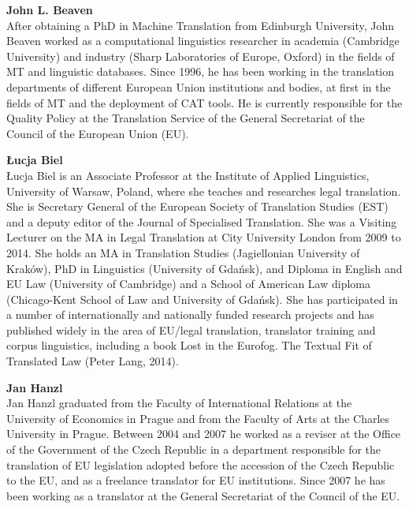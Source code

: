 \noindent
\textbf{John L. Beaven}\\
After obtaining a PhD in Machine Translation from Edinburgh University, John Beaven worked as a computational linguistics researcher in academia (Cambridge University) and industry (Sharp Laboratories of Europe, Oxford) in the fields of MT and linguistic databases. Since 1996, he has been working in the translation departments of different European Union institutions and bodies, at first in the fields of MT and the deployment of CAT tools. He is currently responsible for the Quality Policy at the Translation Service of the General Secretariat of the Council of the European Union (EU).

\medskip\noindent
\textbf{Łucja Biel}\\
Łucja Biel is an Associate Professor at the Institute of Applied Linguistics, University of Warsaw, Poland, where she teaches and researches legal translation. She is Secretary General of the European Society of Translation Studies (EST) and a deputy editor of the Journal of Specialised Translation. She was a Visiting Lecturer on the MA in Legal Translation at City University London from 2009 to 2014. She holds an MA in Translation Studies (Jagiellonian University of Kraków), PhD in Linguistics (University of Gdańsk), and Diploma in English and EU Law (University of Cambridge) and a School of American Law diploma (Chicago-Kent School of Law and University of Gdańsk). She has participated in a number of internationally and nationally funded research projects and has published widely in the area of EU/legal translation, translator training and corpus linguistics, including a book Lost in the Eurofog. The Textual Fit of Translated Law (Peter Lang, 2014).

\medskip\noindent
\textbf{Jan Hanzl}\\
Jan Hanzl graduated from the Faculty of International Relations at the University of Economics in Prague and from the Faculty of Arts at the Charles University in Prague. Between 2004 and 2007 he worked as a reviser at the Office of the Government of the Czech Republic in a department responsible for the translation of EU legislation adopted before the accession of the Czech Republic to the EU, and as a freelance translator for EU institutions. Since 2007 he has been working as a translator at the General Secretariat of the Council of the EU.

